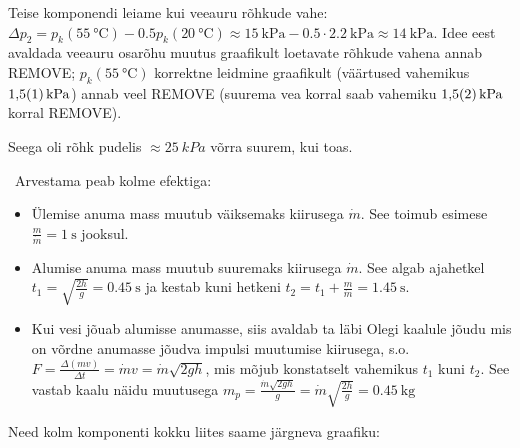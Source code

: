 \documentclass[10pt]{article}
\newcommand{\p}[1]{REMOVE}
\begin{document}
Teise komponendi leiame kui veeauru rõhkude vahe: $\Delta p_2 = p_k(\qty{55}{\celsius}) - \num{0.5}p_k(\qty{20}{\celsius}) \approx \SI{15}{\kPa} -\num{0.5}\cdot\qty{2.2}{\kPa}\approx \qty{14}{\kPa}$. Idee eest avaldada veeauru osarõhu muutus graafikult loetavate rõhkude vahena annab \p1; $p_k(\SI{55}\celsius)$ korrektne leidmine graafikult (väärtused vahemikus $\SI{1.5\pm 0.1}{kPa}$)  annab veel \p1 (suurema vea korral saab vahemiku $\SI{1.5\pm 0.2}{kPa}$ korral \p{0,5}).

Seega oli rõhk pudelis $\approx \SI{25}{kPa}$ võrra suurem, kui toas.
\probend
\bigskip


\solu
\
Arvestama peab kolme efektiga:
\begin{itemize}
\item Ülemise anuma mass muutub väiksemaks kiirusega $\dot{m}$. See toimub esimese $\frac{m}{\dot{m}}=\SI{1}{\second}$ jooksul.
\item Alumise anuma mass muutub suuremaks kiirusega $\dot{m}$. See algab ajahetkel $t_1=\sqrt{\frac{2h}{g}}= \SI{0.45}{\second}$ ja kestab kuni hetkeni $t_2 = t_1 + \frac{m}{\dot{m}} = \SI{1.45}{\second}$.
\item Kui vesi jõuab alumisse anumasse, siis avaldab ta läbi Olegi kaalule jõudu mis on võrdne anumasse jõudva impulsi muutumise kiirusega, s.o. $F = \frac{\Delta (mv)}{\Delta{t}} = \dot{m}v = \dot{m} \sqrt{2gh}$, mis mõjub konstatselt vahemikus $t_1$ kuni $t_2$. See vastab kaalu näidu muutusega $m_p = \frac{\dot{m} \sqrt{2gh}}{g} = \dot{m}\sqrt{\frac{2h}{g}}= \SI{0.45}{\kilo\gram}$
\end{itemize}
Need kolm komponenti kokku liites saame järgneva graafiku:

\begin{figure}[h]
\centering
\end{figure}
\probend
\bigskip

\end{document}
